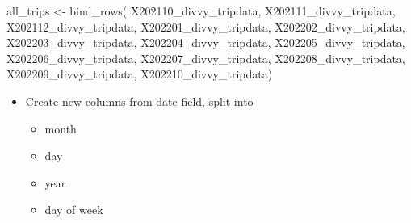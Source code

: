 \documentclass[
]{article}
\newenvironment{Shaded}{\begin{snugshade}}{\end{snugshade}}
\newcommand{\FunctionTok}[1]{\textcolor[rgb]{0.00,0.00,0.00}{#1}}
\newcommand{\NormalTok}[1]{#1}
\newcommand{\OtherTok}[1]{\textcolor[rgb]{0.56,0.35,0.01}{#1}}
\newcommand{\SpecialCharTok}[1]{\textcolor[rgb]{0.00,0.00,0.00}{#1}}
\newcommand{\StringTok}[1]{\textcolor[rgb]{0.31,0.60,0.02}{#1}}
\providecommand{\tightlist}{%
  \setlength{\itemsep}{0pt}\setlength{\parskip}{0pt}}
\begin{document}
\begin{Shaded}
\begin{Highlighting}[]
\NormalTok{all\_trips }\OtherTok{\textless{}{-}} \FunctionTok{bind\_rows}\NormalTok{(}
\NormalTok{                  X202110\_divvy\_tripdata, X202111\_divvy\_tripdata, X202112\_divvy\_tripdata, X202201\_divvy\_tripdata,}
\NormalTok{                  X202202\_divvy\_tripdata, X202203\_divvy\_tripdata, X202204\_divvy\_tripdata, X202205\_divvy\_tripdata,}
\NormalTok{                  X202206\_divvy\_tripdata, X202207\_divvy\_tripdata, X202208\_divvy\_tripdata, X202209\_divvy\_tripdata, }
\NormalTok{                  X202210\_divvy\_tripdata)}
\end{Highlighting}
\end{Shaded}

\fontsize{10}{12}
\selectfont

\begin{itemize}
\tightlist
\item
  Create new columns from date field, split into

  \begin{itemize}
  \tightlist
  \item
    month
  \item
    day
  \item
    year
  \item
    day of week
  \end{itemize}
\end{itemize}

\fontsize{9}{11}
\selectfont

\begin{Shaded}
\end{Shaded}
\end{document}
